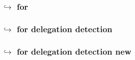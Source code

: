 \subsubsection{\hubMod{} $\hookrightarrow$ \romLexMod{} for \cfi{}                    }  \label{hub: lookups: into romLex: for cfi}              %
\subsubsection{\hubMod{} $\hookrightarrow$ \romLexMod{} for delegation detection      }  \label{hub: lookups: into romLex: for delegation}       %
\subsubsection{\hubMod{} $\hookrightarrow$ \romLexMod{} for delegation detection new  }  \label{hub: lookups: into romLex: for delegation new}   %


